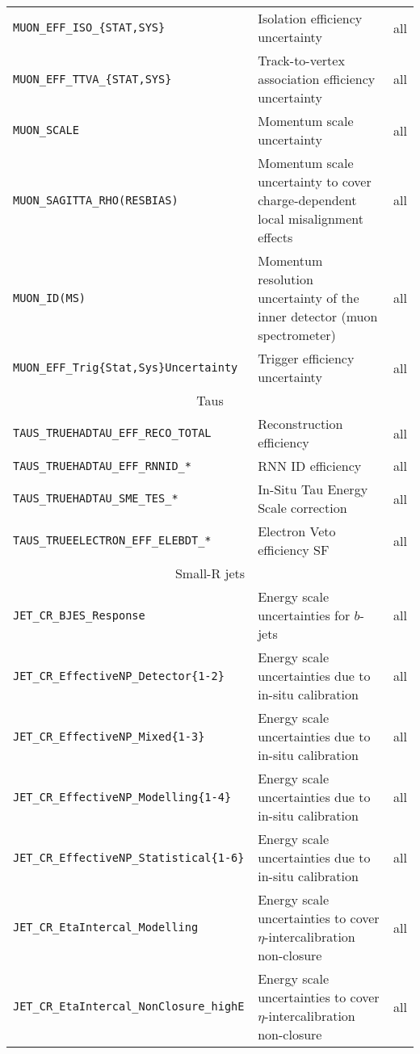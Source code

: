 \begin{table}
{\begin{tabular}{lll}
        \texttt{MUON\_EFF\_ISO\_\{STAT,SYS\} }& {Isolation efficiency uncertainty} & all \\
        \texttt{MUON\_EFF\_TTVA\_\{STAT,SYS\} }& {Track-to-vertex association efficiency uncertainty} & all \\
        \texttt{MUON\_SCALE}&    Momentum scale uncertainty & all \\
        \texttt{MUON\_SAGITTA\_RHO(RESBIAS)} & Momentum scale uncertainty to cover charge-dependent local misalignment effects & all \\
        \texttt{MUON\_ID(MS) }& Momentum resolution uncertainty of the inner detector (muon spectrometer) & all \\
        \texttt{MUON\_EFF\_Trig\{Stat,Sys\}Uncertainty} & Trigger efficiency uncertainty & all \\
        \hline
        \multicolumn{3}{c}{Taus}\\
        \hline
        \texttt{TAUS\_TRUEHADTAU\_EFF\_RECO\_TOTAL}& {Reconstruction efficiency} & all \\
        \texttt{TAUS\_TRUEHADTAU\_EFF\_RNNID\_*}& {RNN ID efficiency} & all \\
        \texttt{TAUS\_TRUEHADTAU\_SME\_TES\_*}& {In-Situ Tau Energy Scale correction} & all \\
        \texttt{TAUS\_TRUEELECTRON\_EFF\_ELEBDT\_*}& {Electron Veto efficiency SF} & all \\
        \hline
        \multicolumn{3}{c}{Small-R jets}\\
        \hline
        \texttt{JET\_CR\_BJES\_Response }& Energy scale uncertainties for $b$-jets & all \\
        \texttt{JET\_CR\_EffectiveNP\_Detector\{1-2\} }& Energy scale uncertainties due to in-situ calibration & all \\
        \texttt{JET\_CR\_EffectiveNP\_Mixed\{1-3\} }& Energy scale uncertainties due to in-situ calibration & all  \\
        \texttt{JET\_CR\_EffectiveNP\_Modelling\{1-4\} }& Energy scale uncertainties due to in-situ calibration & all \\
        \texttt{JET\_CR\_EffectiveNP\_Statistical\{1-6\} }& Energy scale uncertainties due to in-situ calibration & all \\
        \texttt{JET\_CR\_EtaIntercal\_Modelling}& Energy scale uncertainties to cover $\eta$-intercalibration non-closure & all \\
        \texttt{JET\_CR\_EtaIntercal\_NonClosure\_highE}& Energy scale uncertainties to cover $\eta$-intercalibration non-closure & all \\

\end{tabular}}
\end{table}
